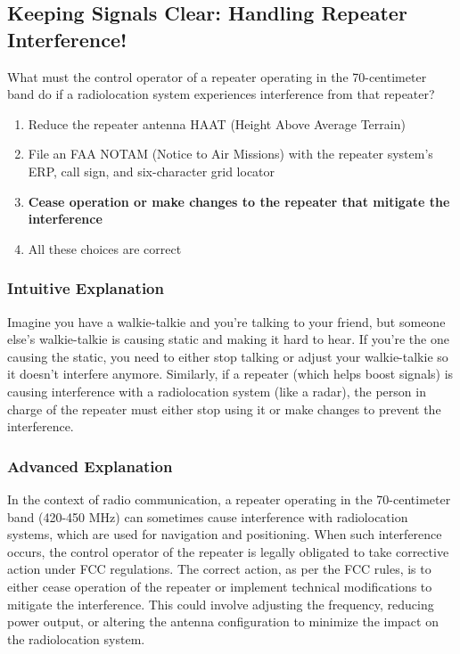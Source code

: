 \subsection{Keeping Signals Clear: Handling Repeater Interference!}

\begin{tcolorbox}[colback=gray!10!white,colframe=black!75!black,title=\textbf{E1B04}]
What must the control operator of a repeater operating in the 70-centimeter band do if a radiolocation system experiences interference from that repeater?
\begin{enumerate}[label=\Alph*.]
    \item Reduce the repeater antenna HAAT (Height Above Average Terrain)
    \item File an FAA NOTAM (Notice to Air Missions) with the repeater system's ERP, call sign, and six-character grid locator
    \item \textbf{Cease operation or make changes to the repeater that mitigate the interference}
    \item All these choices are correct
\end{enumerate}
\end{tcolorbox}

\subsubsection*{Intuitive Explanation}
Imagine you have a walkie-talkie and you’re talking to your friend, but someone else’s walkie-talkie is causing static and making it hard to hear. If you’re the one causing the static, you need to either stop talking or adjust your walkie-talkie so it doesn’t interfere anymore. Similarly, if a repeater (which helps boost signals) is causing interference with a radiolocation system (like a radar), the person in charge of the repeater must either stop using it or make changes to prevent the interference.

\subsubsection*{Advanced Explanation}
In the context of radio communication, a repeater operating in the 70-centimeter band (420-450 MHz) can sometimes cause interference with radiolocation systems, which are used for navigation and positioning. When such interference occurs, the control operator of the repeater is legally obligated to take corrective action under FCC regulations. The correct action, as per the FCC rules, is to either cease operation of the repeater or implement technical modifications to mitigate the interference. This could involve adjusting the frequency, reducing power output, or altering the antenna configuration to minimize the impact on the radiolocation system.


